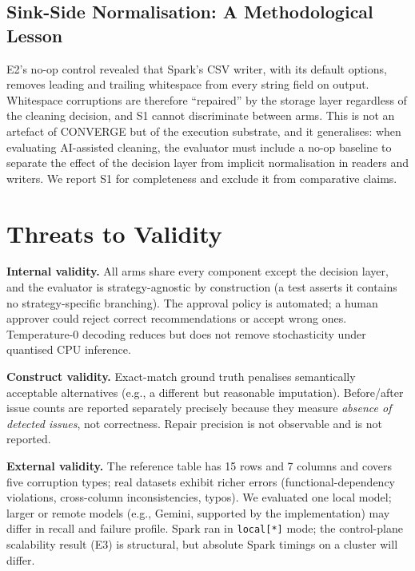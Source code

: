 \subsection{Sink-Side Normalisation: A Methodological Lesson}
E2's no-op control revealed that Spark's CSV writer, with its default options, removes leading and trailing whitespace from every string field on output. Whitespace corruptions are therefore ``repaired'' by the storage layer regardless of the cleaning decision, and S1 cannot discriminate between arms. This is not an artefact of CONVERGE but of the execution substrate, and it generalises: when evaluating AI-assisted cleaning, the evaluator must include a no-op baseline to separate the effect of the decision layer from implicit normalisation in readers and writers. We report S1 for completeness and exclude it from comparative claims.

\section{Threats to Validity}
\label{sec:threats}
\noindent\textbf{Internal validity.} All arms share every component except the decision layer, and the evaluator is strategy-agnostic by construction (a test asserts it contains no strategy-specific branching). The approval policy is automated; a human approver could reject correct recommendations or accept wrong ones. Temperature-$0$ decoding reduces but does not remove stochasticity under quantised CPU inference.

\noindent\textbf{Construct validity.} Exact-match ground truth penalises semantically acceptable alternatives (e.g., a different but reasonable imputation). Before/after issue counts are reported separately precisely because they measure \emph{absence of detected issues}, not correctness. Repair precision is not observable and is not reported.

\noindent\textbf{External validity.} The reference table has 15 rows and 7 columns and covers five corruption types; real datasets exhibit richer errors (functional-dependency violations, cross-column inconsistencies, typos). We evaluated one local model; larger or remote models (e.g., Gemini, supported by the implementation) may differ in recall and failure profile. Spark ran in \texttt{local[*]} mode; the control-plane scalability result (E3) is structural, but absolute Spark timings on a cluster will differ.

